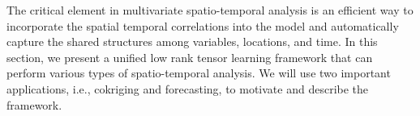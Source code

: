 The critical element in multivariate spatio-temporal analysis is an efficient way to incorporate the spatial temporal correlations  into the model and automatically capture the shared structures among variables, locations, and time. In this section, we present a unified low rank tensor learning framework that can perform various types of spatio-temporal analysis. We will use two important applications, i.e., cokriging and forecasting,  to motivate and describe the framework. %
